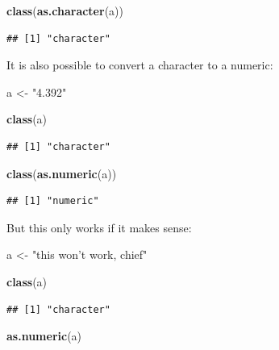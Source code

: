 \documentclass[]{gitbook}
\newenvironment{Shaded}{\begin{snugshade}}{\end{snugshade}}
\newcommand{\KeywordTok}[1]{\textcolor[rgb]{0.13,0.29,0.53}{\textbf{#1}}}
\newcommand{\NormalTok}[1]{#1}
\newcommand{\StringTok}[1]{\textcolor[rgb]{0.31,0.60,0.02}{#1}}
\begin{document}
\begin{Shaded}
\begin{Highlighting}[]
\KeywordTok{class}\NormalTok{(}\KeywordTok{as.character}\NormalTok{(a))}
\end{Highlighting}
\end{Shaded}

\begin{verbatim}
## [1] "character"
\end{verbatim}

It is also possible to convert a character to a numeric:

\begin{Shaded}
\begin{Highlighting}[]
\NormalTok{a <-}\StringTok{ "4.392"}

\KeywordTok{class}\NormalTok{(a)}
\end{Highlighting}
\end{Shaded}

\begin{verbatim}
## [1] "character"
\end{verbatim}

\begin{Shaded}
\begin{Highlighting}[]
\KeywordTok{class}\NormalTok{(}\KeywordTok{as.numeric}\NormalTok{(a))}
\end{Highlighting}
\end{Shaded}

\begin{verbatim}
## [1] "numeric"
\end{verbatim}

But this only works if it makes sense:

\begin{Shaded}
\begin{Highlighting}[]
\NormalTok{a <-}\StringTok{ "this won't work, chief"}

\KeywordTok{class}\NormalTok{(a)}
\end{Highlighting}
\end{Shaded}

\begin{verbatim}
## [1] "character"
\end{verbatim}

\begin{Shaded}
\begin{Highlighting}[]
\KeywordTok{as.numeric}\NormalTok{(a)}
\end{Highlighting}
\end{Shaded}
\end{document}
